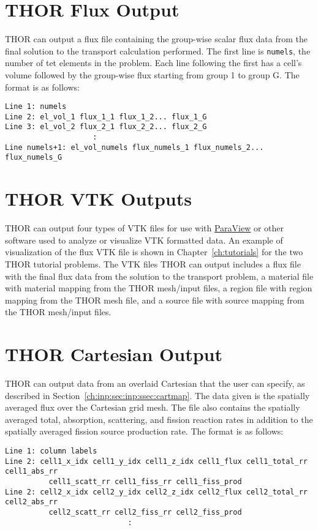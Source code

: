 \section{THOR Flux Output}\label{ch:out:sec:flux}

THOR can output a flux file containing the group-wise scalar flux data from the final solution to the transport calculation performed.
The first line is \verb"numels", the number of tet elements in the problem.
Each line following the first has a cell's volume followed by the group-wise flux starting from group 1 to group G.
The format is as follows:
\begin{verbatim}
Line 1: numels
Line 2: el_vol_1 flux_1_1 flux_1_2... flux_1_G
Line 3: el_vol_2 flux_2_1 flux_2_2... flux_2_G
                    :
Line numels+1: el_vol_numels flux_numels_1 flux_numels_2... flux_numels_G
\end{verbatim}

\section{THOR VTK Outputs}\label{ch:out:sec:vtk}

THOR can output four types of VTK files for use with \href{https://www.paraview.org/}{ParaView} or other software used to analyze or visualize VTK formatted data.
An example of visualization of the flux VTK file is shown in Chapter~\ref{ch:tutorials} for the two THOR tutorial problems.
The VTK files THOR can output includes a flux file with the final flux data from the solution to the transport problem, a material file with material mapping from the THOR mesh/input files, a region file with region mapping from the THOR mesh file, and a source file with source mapping from the THOR mesh/input files.

\section{THOR Cartesian Output}\label{ch:out:sec:cart}

THOR can output data from an overlaid Cartesian that the user can specify, as described in Section~\ref{ch:inp:sec:inp:ssec:cartmap}.
The data given is the spatially averaged flux over the Cartesian grid mesh.
The file also contains the spatially averaged total, absorption, scattering, and fission reaction rates in addition to the spatially averaged fission source production rate.
The format is as follows:
\begin{verbatim}
Line 1: column labels
Line 2: cell1_x_idx cell1_y_idx cell1_z_idx cell1_flux cell1_total_rr cell1_abs_rr
          cell1_scatt_rr cell1_fiss_rr cell1_fiss_prod
Line 2: cell2_x_idx cell2_y_idx cell2_z_idx cell2_flux cell2_total_rr cell2_abs_rr
          cell2_scatt_rr cell2_fiss_rr cell2_fiss_prod
                            :
\end{verbatim}